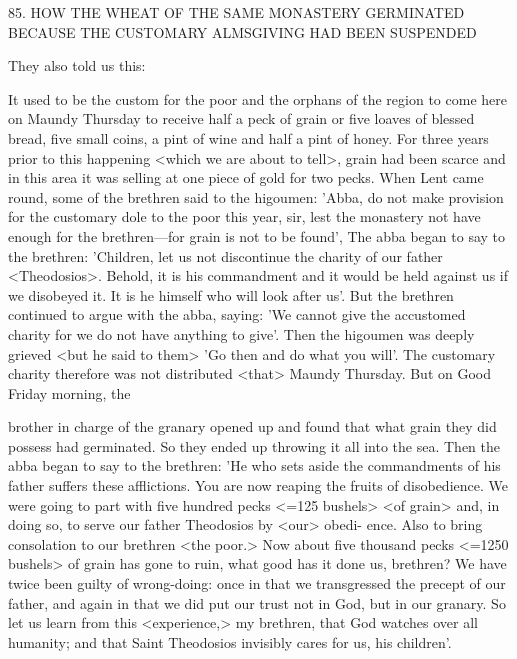 85. HOW THE WHEAT OF THE SAME MONASTERY
GERMINATED BECAUSE THE CUSTOMARY
ALMSGIVING HAD BEEN SUSPENDED

They also told us this:

It used to be the custom for the poor and the orphans of the region
to come here on Maundy Thursday to receive half a peck of grain
or five loaves of blessed bread, five small coins, a pint of wine and
half a pint of honey. For three years prior to this happening <which
we are about to tell>, grain had been scarce and in this area it was
selling at one piece of gold for two pecks. When Lent came round,
some of the brethren said to the higoumen: 'Abba, do not make
provision for the customary dole to the poor this year, sir, lest the
monastery not have enough for the brethren—for grain is not to be
found', The abba began to say to the brethren: 'Children, let us not
discontinue the charity of our father <Theodosios>. Behold, it is his
commandment and it would be held against us if we disobeyed it.
It is he himself who will look after us'. But the brethren continued
to argue with the abba, saying: 'We cannot give the accustomed
charity for we do not have anything to give'. Then the higoumen
was deeply grieved <but he said to them> 'Go then and do what
you will'. The customary charity therefore was not distributed
<that> Maundy Thursday. But on Good Friday morning, the

brother in charge of the granary opened up and found that what
grain they did possess had germinated. So they ended up throwing
it all into the sea. Then the abba began to say to the brethren: 'He
who sets aside the commandments of his father suffers these
afflictions. You are now reaping the fruits of disobedience. We were
going to part with five hundred pecks <=125 bushels> <of grain>
and, in doing so, to serve our father Theodosios by <our> obedi-
ence. Also to bring consolation to our brethren <the poor.> Now
about five thousand pecks <=1250 bushels> of grain has gone to
ruin, what good has it done us, brethren? We have twice been guilty
of wrong-doing: once in that we transgressed the precept of our
father, and again in that we did put our trust not in God, but in our
granary. So let us learn from this <experience,> my brethren, that
God watches over all humanity; and that Saint Theodosios invisibly
cares for us, his children'.

